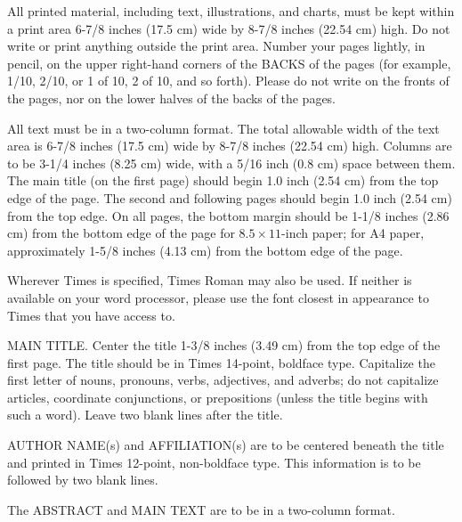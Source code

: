\documentclass[times, 10pt,twocolumn]{article}
\begin{document}

All printed material, including text, illustrations, and charts, must be
kept within a print area 6-7/8 inches (17.5 cm) wide by 8-7/8 inches
(22.54 cm) high.  Do not write or print anything outside the print area.
Number your pages lightly, in pencil, on the upper right-hand corners of
the BACKS of the pages (for example, 1/10, 2/10, or 1 of 10, 2 of 10, and
so forth). Please do not write on the fronts of the pages, nor on the
lower halves of the backs of the pages.



All text must be in a two-column format. The total allowable width of the
text area is 6-7/8 inches (17.5 cm) wide by 8-7/8 inches (22.54 cm) high.
Columns are to be 3-1/4 inches (8.25 cm) wide, with a 5/16 inch (0.8 cm)
space between them.  The main title (on the first page) should begin 1.0
inch (2.54 cm) from the top edge of the page. The second and following
pages should begin 1.0 inch (2.54 cm) from the top edge. On all pages, the
bottom margin should be 1-1/8 inches (2.86 cm) from the bottom edge of the
page for $8.5 \times 11$-inch paper; for A4 paper, approximately 1-5/8
inches (4.13 cm) from the bottom edge of the page.


Wherever Times is specified, Times Roman may also be used.  If neither is
available on your word processor, please use the font closest in
appearance to Times that you have access to.

MAIN TITLE. Center the title 1-3/8 inches (3.49 cm) from the top edge of
the first page. The title should be in Times 14-point, boldface type.
Capitalize the first letter of nouns, pronouns, verbs, adjectives, and
adverbs; do not capitalize articles, coordinate conjunctions, or
prepositions (unless the title begins with such a word).  Leave two blank
lines after the title.

AUTHOR NAME(s) and AFFILIATION(s) are to be centered beneath the title and
printed in Times 12-point, non-boldface type.  This information is to be
followed by two blank lines.

The ABSTRACT and MAIN TEXT are to be in a two-column format. 
\end{document}

